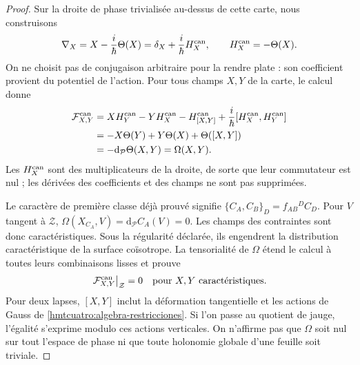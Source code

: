\begin{proof}
Sur la droite de phase trivialisée au-dessus de cette carte, nous construisons
\begin{equation}
 \nabla_X=X-\frac{i}{\hbar}\Theta(X)
       =\delta_X+\frac{i}{\hbar}H_X^{\rm can},
 \qquad H_X^{\rm can}=-\Theta(X).
 \label{hmtcuatro:conexion-canonica}
\end{equation}
On ne choisit pas de conjugaison arbitraire pour la rendre plate : son coefficient provient du potentiel de l’action. Pour tous champs \(X,Y\) de la carte, le calcul donne
\begin{equation}
 \begin{aligned}
 \mathcal F^{\rm can}_{X,Y}
 &=XH_Y^{\rm can}-YH_X^{\rm can}-H_{[X,Y]}^{\rm can}
       +\frac{i}{\hbar}[H_X^{\rm can},H_Y^{\rm can}]\\
 &=-X\Theta(Y)+Y\Theta(X)+\Theta([X,Y])\\
 &=-\mathrm d_{\mathcal P}\Theta(X,Y)=\Omega(X,Y).
 \end{aligned}
 \label{hmtcuatro:curvatura-calculada}
\end{equation}
Les \(H_X^{\rm can}\) sont des multiplicateurs de la droite, de sorte que leur commutateur est nul ; les dérivées des coefficients et des champs ne sont pas supprimées.

Le caractère de première classe déjà prouvé signifie \(\{C_A,C_B\}_D=f_{AB}{}^D C_D\). Pour \(V\) tangent à \(\mathcal Z\), \(\Omega(X_{C_A},V)=\mathrm d_{\mathcal P}C_A(V)=0\). Les champs des contraintes sont donc caractéristiques. Sous la régularité déclarée, ils engendrent la distribution caractéristique de la surface coïsotrope. La tensorialité de \(\Omega\) étend le calcul à toutes leurs combinaisons lisses et prouve
\begin{equation}
 \left.\mathcal F^{\rm can}_{X,Y}\right|_{\mathcal Z}=0
 \quad\hbox{pour }X,Y\hbox{ caractéristiques}.
 \label{hmtcuatro:cierre-caracteristico}
\end{equation}
Pour deux lapses, \([X,Y]\) inclut la déformation tangentielle et les actions de Gauss de \eqref{hmtcuatro:algebra-restricciones}. Si l’on passe au quotient de jauge, l’égalité s’exprime modulo ces actions verticales. On n’affirme pas que \(\Omega\) soit nul sur tout l’espace de phase ni que toute holonomie globale d’une feuille soit triviale.


\end{proof}
